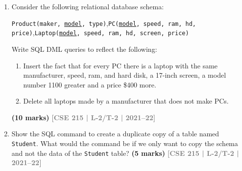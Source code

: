 \documentclass[12pt,a3paper]{article}
\newcommand{\yr}[1]{\hfill\textcolor{gray}{\small\textbf{[#1]}}}
\newcommand{\mk}[1]{\textcolor{orange!70!black}{\small\textbf{(#1 marks)}}}
\begin{document}
\begin{enumerate}
\vspace{0.2cm}
\noindent ii. List the name of the toys that has weight more than the average weight of the toys with the same color.

\vspace{0.2cm}
\noindent iii. List the name of the requesting clients who have to wait because the toys are currently unavailable at the store.

\vspace{0.2cm}
\noindent iv. List all of the requests where \textit{age} of the client is less than the \textit{min-age} listed for the Toy. The answer should include the client id, client name, and the toy id. The results should be sorted by client name.

\vspace{0.2cm}
\noindent v. Give the id and name of the "most popular" toy. The most popular toy is the one that has more requests than all others. If there is a tie so there is more than one toy with the maximum number of requests, give the id's and names of all of these toys. They do not need to be in any particular order.

\vspace{0.5cm}
\mk{25} \yr{CSE 215 | L-2/T-2 | 2021--22}

\item Consider the following relational database schema:
\begin{center}
\texttt{Product(maker, \underline{model}, type)},\quad \texttt{PC(\underline{model}, speed, ram, hd, price)},\quad \texttt{Laptop(\underline{model}, speed, ram, hd, screen, price)}
\end{center}
Write SQL DML queries to reflect the following:
\begin{enumerate}
  \item Insert the fact that for every PC there is a laptop with the same manufacturer, speed, ram, and hard disk, a 17-inch screen, a model number 1100 greater and a price \$400 more.
  \item Delete all laptops made by a manufacturer that does not make PCs.
\end{enumerate}
\mk{10} \yr{CSE 215 | L-2/T-2 | 2021--22}

\item Show the SQL command to create a duplicate copy of a table named \texttt{Student}. What would the command be if we only want to copy the schema and not the data of the \texttt{Student} table?
\mk{5} \yr{CSE 215 | L-2/T-2 | 2021--22}


\end{enumerate}
\end{document}
